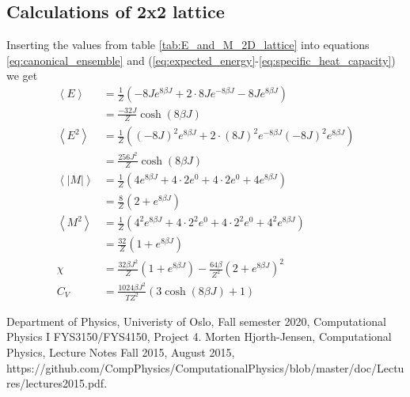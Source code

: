 \documentclass[reprint, english,notitlepage,nofootinbib]{revtex4-1}  %
\begin{document}
\subsection{Calculations of 2x2 lattice} \label{calc_of_22_lattice}

Inserting the values from table \ref{tab:E_and_M_2D_lattice} into equations \eqref{eq:canonical_ensemble} and (\ref{eq:expected_energy}-\ref{eq:specific_heat_capacity}) we get
\begin{align*}
	\left<E\right> &= \frac{1}{Z}\left(-8Je^{8\beta J} + 2\cdot 8Je^{-8\beta J} - 8J e^{8\beta J}\right) \\
	&= \frac{-32J}{Z}\cosh(8\beta J)\\
	\left<E^2\right> &= \frac{1}{Z}\left((-8J)^2e^{8\beta J} + 2\cdot (8J)^2e^{-8\beta J} (- 8J)^2 e^{8\beta J}\right) \\
	&= \frac{256J^2}{Z}\cosh(8\beta J)\\
	\left<|M|\right> &= \frac{1}{Z}\left(4e^{8\beta J} + 4\cdot 2e^{0} + 4\cdot 2 e^{0} + 4e^{8\beta J}\right) \\
	&= \frac{8}{Z}\left(2 + e^{8\beta J}\right)\\
	\left<M^2\right> &= \frac{1}{Z}\left(4^2e^{8\beta J} + 4\cdot 2^2e^{0} + 4\cdot 2^2 e^{0} + 4^2e^{8\beta J}\right) \\
	&= \frac{32}{Z}\left(1 + e^{8\beta J}\right)\\
	\chi &= \frac{32\beta J^2}{Z}\left(1 + e^{8\beta J}\right) - \frac{64\beta}{Z^2}\left(2 + e^{8\beta J}\right)^2 \\
	C_V &= \frac{1024\beta J^2}{TZ^2}\left(3\cosh(8\beta J) + 1\right)
\end{align*}


\onecolumngrid
\vspace{1cm} %

\begin{thebibliography}{}
 Department of Physics, Univeristy of Oslo, Fall semester 2020, Computational Physics I FYS3150/FYS4150, Project 4.
 Morten Hjorth-Jensen, Computational Physics, Lecture Notes Fall 2015, August 2015, https://github.com/CompPhysics/ComputationalPhysics/blob/master/doc/Lectures/lectures2015.pdf.

\end{thebibliography}
\end{document}
